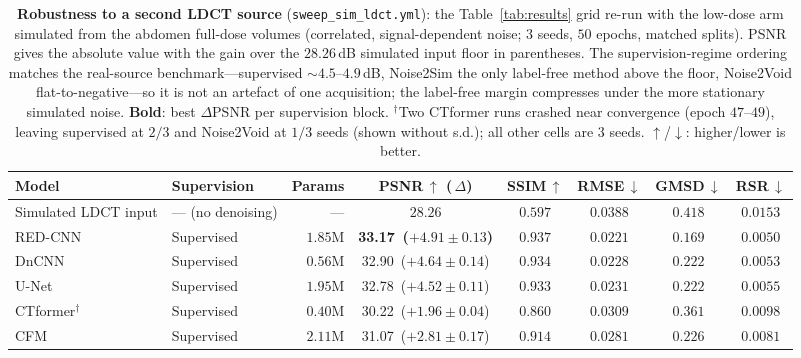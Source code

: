 \begin{table}[t]
  \centering
  \small
  \caption{\textbf{Robustness to a second LDCT source} (\texttt{sweep\_sim\_ldct.yml}):
           the Table~\ref{tab:results} grid re-run with the low-dose arm
           simulated from the abdomen full-dose volumes (correlated,
           signal-dependent noise; $3$ seeds, $50$ epochs, matched splits).  PSNR
           gives the absolute value with the gain over the $28.26$\,dB simulated
           input floor in parentheses.  The supervision-regime ordering matches the
           real-source benchmark---supervised $\sim$$4.5$--$4.9$\,dB, Noise2Sim the
           only label-free method above the floor, Noise2Void flat-to-negative---so
           it is not an artefact of one acquisition; the label-free margin
           compresses under the more stationary simulated noise.  \textbf{Bold}:
           best $\Delta$PSNR per supervision block.  $^{\dagger}$Two CTformer runs
           crashed near convergence (epoch $47$--$49$), leaving supervised at
           $2/3$ and Noise2Void at $1/3$ seeds (shown without s.d.); all other
           cells are $3$ seeds.  $\uparrow$/$\downarrow$: higher/lower is better.}
  \label{tab:sim-ldct}
  \begin{tabular}{llrccccc}
    \toprule
    \textbf{Model} & \textbf{Supervision} & \textbf{Params} &
    PSNR\,$\uparrow$ (\,$\Delta$) & SSIM\,$\uparrow$ & RMSE\,$\downarrow$ &
    GMSD\,$\downarrow$ & RSR\,$\downarrow$ \\
    \midrule
    Simulated LDCT input & --- (no denoising) & --- & $28.26$ & $0.597$ & $0.0388$ & $0.418$ & $0.0153$ \\
    \midrule
    RED-CNN~\cite{chen2017lowdose}   & Supervised & $1.85\mathrm{M}$ & \textbf{33.17 \,($+4.91{\pm}0.13$)} & $0.937$ & $0.0221$ & $0.169$ & $0.0050$ \\
    DnCNN~\cite{zhang2017beyond}     & Supervised & $0.56\mathrm{M}$ & 32.90 \,($+4.64{\pm}0.14$) & $0.934$ & $0.0228$ & $0.222$ & $0.0053$ \\
    U-Net                            & Supervised & $1.95\mathrm{M}$ & 32.78 \,($+4.52{\pm}0.11$) & $0.933$ & $0.0231$ & $0.222$ & $0.0055$ \\
    CTformer$^{\dagger}$~\cite{wang2022ctformer} & Supervised & $0.40\mathrm{M}$ & 30.22 \,($+1.96{\pm}0.04$) & $0.860$ & $0.0309$ & $0.361$ & $0.0098$ \\
    CFM~\cite{lipman2022flow}        & Supervised & $2.11\mathrm{M}$ & 31.07 \,($+2.81{\pm}0.17$) & $0.914$ & $0.0281$ & $0.226$ & $0.0081$ \\

\end{tabular}
\end{table}
